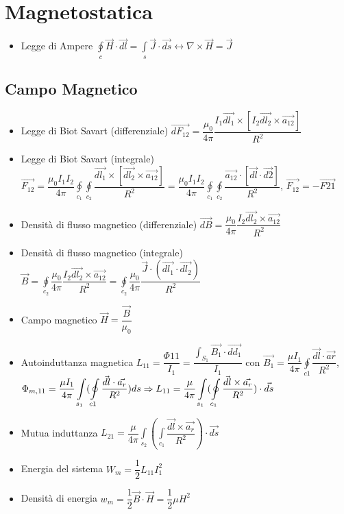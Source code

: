 \documentclass{article}
\begin{document}
\newpage

\section{Magnetostatica}
\begin{itemize}
	\item Legge di Ampere \( \displaystyle \oint\limits_{c} \vec{H} \cdot \vec{dl} = \int\limits_{s} \vec{J} \cdot \vec{ds} \leftrightarrow \nabla \times \vec{H} = \vec{J} \)
\end{itemize}

\subsection{Campo Magnetico}
\begin{itemize}
	\item Legge di Biot Savart (differenziale) \( \vec{dF_{12}} = \dfrac{\mu_0}{4 \pi} \dfrac{I_1 \vec{dl_1} \times [I_2 \vec{dl_2} \times \vec{a_{12}}] }{R^2} \)
	\item Legge di Biot Savart (integrale) \(\displaystyle \vec{F_{12}} = \dfrac{\mu_0 I_1 I_2}{4 \pi} \oint\limits_{c_1} \oint\limits_{c_2} \dfrac{\vec{dl_1} \times [\vec{dl_2} \times \vec{a_{12}}]} {R^2} = \dfrac{\mu_0 I_1 I_2}{4 \pi} \oint\limits_{c_1} \oint\limits_{c_2} \dfrac{\vec{a_{12}} \cdot [\vec{dl} \cdot \vec{d2}]} {R^2} \), \(\vec{F_{12}} = - \vec{F{21}} \)
	\item Densità di flusso magnetico (differenziale) \( \vec{dB} = \dfrac{\mu_0}{4 \pi} \dfrac{I_2 \vec{dl_2} \times \vec{a_{12}}}{R^2} \)
	\item Densità di flusso magnetico (integrale) \(\displaystyle \vec{B} = \oint\limits_{c_2} \dfrac{\mu_0}{4 \pi} \dfrac{I_2 \vec{dl_2} \times \vec{a_{12}}}{R^2} = \oint\limits_{c_2} \dfrac{\mu_0}{4 \pi} \dfrac{\vec{J} \cdot ( \vec{dl_{1}} \cdot \vec{dl_2} )}{R^2}\)
	\item Campo magnetico \( \vec{H} = \dfrac{\vec{B}}{\mu_0} \)
	\item Autoinduttanza magnetica \(\displaystyle L_{11} = \dfrac{\Phi{11}}{I_1} = \dfrac{\int_{S_1} \vec{B_1} \cdot \vec{dd_1}}{I_1} \) con \( \vec{B_1} = \dfrac{\mu I_1}{4 \pi} \oint\limits_{c1} \dfrac{\vec{dl} \cdot \vec{ar}}{R^2} \), \(\displaystyle \Phi_{m, 11} = \dfrac{\mu I_1}{4 \pi} \int\limits_{s_1} ( \oint\limits_{c1} \dfrac{\vec{dl} \cdot \vec{a_r}}{R^2}) ds \linebreak \Rightarrow L_{11} = \dfrac{\mu}{4 \pi} \int\limits_{s_1} ( \oint\limits_{c_1} \dfrac{\vec{dl} \times \vec{a_r}}{R^2}) \cdot \vec{ds}\)
	\item Mutua induttanza \(\displaystyle L_{21} = \dfrac{\mu}{4 \pi} \int\limits_{s_2} \left( \int\limits_{c_1} \dfrac{\vec{dl} \times \vec{a_r}}{R^2} \right) \cdot \vec{ds} \)
	\item Energia del sistema \( W_m = \dfrac{1}{2} L_{11} I_1^2 \)
	\item Densità di energia  \( w_m = \dfrac{1}{2} \vec{B} \cdot \vec{H} = \dfrac{1}{2} \mu H^2 \)
\end{itemize}
\end{document}

